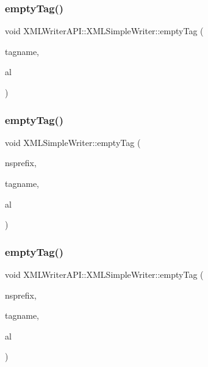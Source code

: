 \subsubsection{\texorpdfstring{emptyTag()}{emptyTag()}\hspace{0.1cm}{\footnotesize\ttfamily [9/12]}}
{\footnotesize\ttfamily void X\+M\+L\+Writer\+A\+P\+I\+::\+X\+M\+L\+Simple\+Writer\+::empty\+Tag (\begin{DoxyParamCaption}\item[{const std\+::string \&}]{tagname,  }\item[{\mbox{\hyperlink{namespaceXMLWriterAPI_a28cf3d8051a4ccf0aef208b7ebc66d07}{Attribute\+List}} \&}]{al }\end{DoxyParamCaption})}

\mbox{\label{classXMLWriterAPI_1_1XMLSimpleWriter_af1ffaaf4a469dfc190be65d4868b0b3d}} 
\subsubsection{\texorpdfstring{emptyTag()}{emptyTag()}\hspace{0.1cm}{\footnotesize\ttfamily [10/12]}}
{\footnotesize\ttfamily void X\+M\+L\+Simple\+Writer\+::empty\+Tag (\begin{DoxyParamCaption}\item[{const std\+::string \&}]{nsprefix,  }\item[{const std\+::string \&}]{tagname,  }\item[{\mbox{\hyperlink{namespaceXMLWriterAPI_a28cf3d8051a4ccf0aef208b7ebc66d07}{Attribute\+List}} \&}]{al }\end{DoxyParamCaption})}

\mbox{\label{classXMLWriterAPI_1_1XMLSimpleWriter_aa5572c81fdebc241db0eac912f0b2b73}} 
\subsubsection{\texorpdfstring{emptyTag()}{emptyTag()}\hspace{0.1cm}{\footnotesize\ttfamily [11/12]}}
{\footnotesize\ttfamily void X\+M\+L\+Writer\+A\+P\+I\+::\+X\+M\+L\+Simple\+Writer\+::empty\+Tag (\begin{DoxyParamCaption}\item[{const std\+::string \&}]{nsprefix,  }\item[{const std\+::string \&}]{tagname,  }\item[{\mbox{\hyperlink{namespaceXMLWriterAPI_a28cf3d8051a4ccf0aef208b7ebc66d07}{Attribute\+List}} \&}]{al }\end{DoxyParamCaption})}


